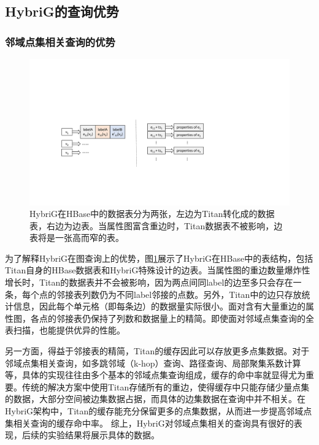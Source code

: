 \subsection{HybriG的查询优势}
\subsubsection{邻域点集相关查询的优势}

\begin{figure}[htbp]
\centering
\includegraphics[width=150mm]{fig/curr_list.pdf}
\caption{HybriG在HBase中的数据表分为两张，左边为Titan转化成的数据表，右边为边表。当属性图富含重边时，Titan数据表不被影响，边表将是一张高而窄的表。}
\label{fig:curr_list}
\end{figure}

为了解释HybriG在图查询上的优势，图\ref{fig:curr_list}展示了HybriG在HBase中的表结构，包括Titan自身的HBase数据表和HybriG特殊设计的边表。当属性图的重边数量爆炸性增长时，Titan的数据表并不会被影响，因为两点间同label的边至多只会存在一条，每个点的邻接表列数仍为不同label邻接的点数。另外，Titan中的边只存放统计信息，因此每个单元格（即每条边）的数据量实际很小。面对含有大量重边的属性图，各点的邻接表仍保持了列数和数据量上的精简。即使面对邻域点集查询的全表扫描，也能提供优异的性能。

另一方面，得益于邻接表的精简，Titan的缓存因此可以存放更多点集数据。对于邻域点集相关查询，如多跳邻域（k-hop）查询、路径查询、局部聚集系数计算等，具体的实现往往由多个基本的邻域点集查询组成，缓存的命中率就显得尤为重要。传统的解决方案中使用Titan存储所有的重边，使得缓存中只能存储少量点集的数据，大部分空间被边集数据占据，而具体的边集数据在查询中并不相关。在HybriG架构中，Titan的缓存能充分保留更多的点集数据，从而进一步提高邻域点集相关查询的缓存命中率。
综上，HybriG对邻域点集相关的查询具有很好的表现，后续的实验结果将展示具体的数据。

